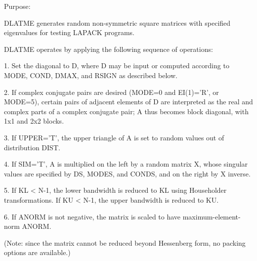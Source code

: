 \begin{DoxyParagraph}{Purpose\+: }
\begin{DoxyVerb}    DLATME generates random non-symmetric square matrices with
    specified eigenvalues for testing LAPACK programs.

    DLATME operates by applying the following sequence of
    operations:

    1. Set the diagonal to D, where D may be input or
         computed according to MODE, COND, DMAX, and RSIGN
         as described below.

    2. If complex conjugate pairs are desired (MODE=0 and EI(1)='R',
         or MODE=5), certain pairs of adjacent elements of D are
         interpreted as the real and complex parts of a complex
         conjugate pair; A thus becomes block diagonal, with 1x1
         and 2x2 blocks.

    3. If UPPER='T', the upper triangle of A is set to random values
         out of distribution DIST.

    4. If SIM='T', A is multiplied on the left by a random matrix
         X, whose singular values are specified by DS, MODES, and
         CONDS, and on the right by X inverse.

    5. If KL < N-1, the lower bandwidth is reduced to KL using
         Householder transformations.  If KU < N-1, the upper
         bandwidth is reduced to KU.

    6. If ANORM is not negative, the matrix is scaled to have
         maximum-element-norm ANORM.

    (Note: since the matrix cannot be reduced beyond Hessenberg form,
     no packing options are available.)\end{DoxyVerb}
 
\end{DoxyParagraph}

